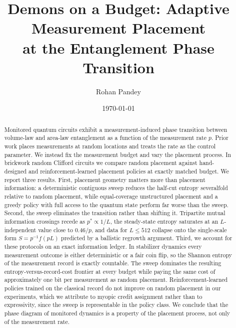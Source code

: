 \documentclass[aps,prb,twocolumn,superscriptaddress,nofootinbib]{revtex4-2}
\begin{document}
\title{Demons on a Budget: Adaptive Measurement Placement\\
at the Entanglement Phase Transition}

\author{Rohan Pandey}

\date{\today}

\begin{abstract}
Monitored quantum circuits exhibit a measurement-induced phase transition
between volume-law and area-law entanglement as a function of the
measurement rate $p$. Prior work places measurements at random locations
and treats the rate as the control parameter. We instead fix the
measurement budget and vary the placement process. In brickwork random
Clifford circuits we compare random placement against hand-designed and
reinforcement-learned placement policies at exactly matched budget. We
report three results. First, placement geometry matters more than
placement information: a deterministic contiguous sweep reduces the
half-cut entropy severalfold relative to random placement, while
equal-coverage unstructured placement and a greedy policy with full access
to the quantum state perform far worse than the sweep. Second, the sweep
eliminates the transition rather than shifting it. Tripartite mutual
information crossings recede as $p^\ast \propto 1/L$, the steady-state
entropy saturates at an $L$-independent value close to $0.46/p$, and data
for $L \le 512$ collapse onto the single-scale form $S = p^{-1} f(pL)$
predicted by a ballistic regrowth argument. Third, we account for these
protocols on an exact information ledger. In stabilizer dynamics every
measurement outcome is either deterministic or a fair coin flip, so the
Shannon entropy of the measurement record is exactly countable. The sweep
dominates the resulting entropy-versus-record-cost frontier at every
budget while paying the same cost of approximately one bit per measurement
as random placement. Reinforcement-learned policies trained on the
classical record do not improve on random placement in our experiments,
which we attribute to myopic credit assignment rather than to
expressivity, since the sweep is representable in the policy class. We
conclude that the phase diagram of monitored dynamics is a property of the
placement process, not only of the measurement rate.
\end{abstract}

\maketitle
\end{document}
